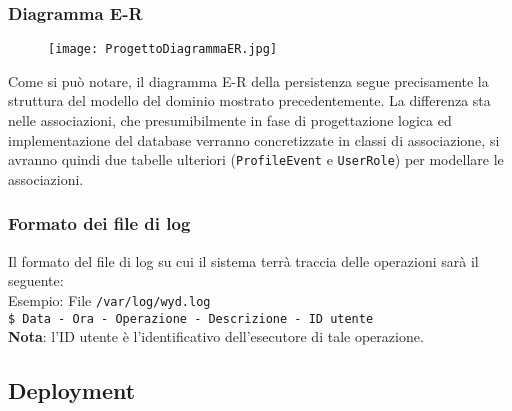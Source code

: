 \subsubsection*{Diagramma E-R}

\begin{figure}[h!]
    \begin{center}
        \texttt{[image: ProgettoDiagrammaER.jpg]}
    \end{center}
\end{figure}

Come si può notare, il diagramma E-R della persistenza segue precisamente la struttura del modello del dominio mostrato precedentemente.
La differenza sta nelle associazioni, che presumibilmente in fase di progettazione logica ed implementazione del database verranno concretizzate in classi di associazione,
si avranno quindi due tabelle ulteriori (\texttt{ProfileEvent} e \texttt{UserRole}) per modellare le associazioni.

\subsubsection{Formato dei file di log}

Il formato del file di log su cui il sistema terrà traccia delle operazioni
sarà il seguente:\\

Esempio: File \texttt{/var/log/wyd.log}\\

\texttt{\$ Data - Ora - Operazione - Descrizione - ID utente}\\
\textbf{Nota}: l'ID utente è l'identificativo dell'esecutore di tale operazione.
\newpage





\subsection{Deployment}

